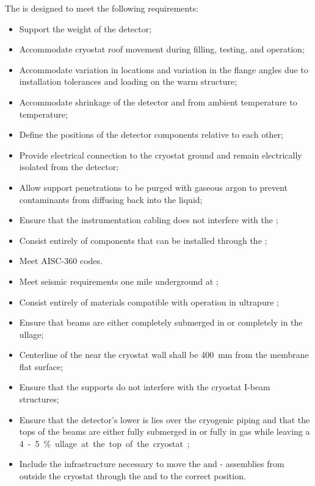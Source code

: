 The  is designed to meet the following  requirements:
\begin{itemize}
 \setlength\itemsep{1mm}
\setlength{\parsep}{1mm}
\setlength{\itemsep}{-5mm}
\item Support the weight of the detector;
\item Accommodate cryostat roof movement during filling, testing, and operation;
\item Accommodate variation in \fdth locations and
  variation in the flange angles due to installation tolerances and
  loading on the warm structure;
\item Accommodate shrinkage of the detector and  from ambient
  temperature to  temperature;
\item Define the positions of the detector components relative to each other; 
\item Provide electrical connection to the cryostat ground and remain electrically isolated from the detector;
\item Allow support penetrations to be purged with gaseous argon to prevent contaminants from diffusing back into the liquid; 
\item Ensure that the instrumentation cabling does not interfere with the ;
\item Consist entirely of components that can  
be installed through the ;
\item Meet AISC-360 codes. 
\item Meet seismic requirements one mile underground at ;
\item Consist entirely of materials compatible %
with operation in ultrapure ;
\item Ensure that beams are either completely submerged in  or completely in the ullage;  
\item Centerline of the  near the cryostat wall shall be \SI{400}{mm} from the membrane flat surface;
\item Ensure that the supports do not interfere with the cryostat I-beam structures;
\item Ensure that the detector's lower  is lies over the cryogenic piping and that the tops of the  beams are either fully submerged in  or fully in gas while leaving a \SI{4}-\SI{5}{\%} ullage at the top of the cryostat; 
\item Include the infrastructure necessary to move the  and
  - assemblies from outside the cryostat through the
   and to the correct position.
\end{itemize}

